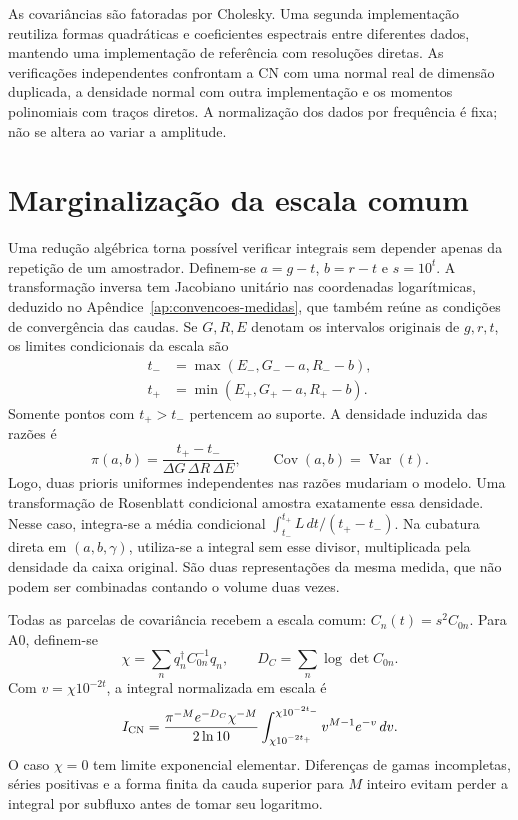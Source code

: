 As covariâncias são fatoradas por Cholesky. Uma segunda implementação
reutiliza formas quadráticas e coeficientes espectrais entre diferentes
dados, mantendo uma implementação de referência com resoluções diretas.
As verificações independentes confrontam a CN com uma normal real de
dimensão duplicada, a densidade normal com outra implementação e os
momentos polinomiais com traços diretos. A normalização dos dados por
frequência é fixa; não se altera ao variar a amplitude.

\section{Marginalização da escala comum}

Uma redução algébrica torna possível verificar integrais sem depender
apenas da repetição de um amostrador. Definem-se
\(a=g-t\), \(b=r-t\) e \(s=10^t\). A transformação inversa
tem Jacobiano unitário nas coordenadas logarítmicas, deduzido no Apêndice~\ref{ap:convencoes-medidas}, que também reúne as condições de convergência das caudas. Se \(G,R,E\)
denotam os intervalos originais de \(g,r,t\), os limites condicionais
da escala são
\begin{align}
 t_-&=\max(E_-,G_--a,R_--b),\nonumber\\
 t_+&=\min(E_+,G_+-a,R_+-b).
 \label{eq:inf-suporte-escala}
\end{align}
Somente pontos com \(t_+>t_-\) pertencem ao suporte. A densidade
induzida das razões é
\begin{equation}
 \pi(a,b)=\frac{t_+-t_-}{\Delta G\,\Delta R\,\Delta E},
 \qquad \operatorname{Cov}(a,b)=\operatorname{Var}(t).
 \label{eq:inf-prior-razoes}
\end{equation}
Logo, duas prioris uniformes independentes nas razões mudariam o modelo.
Uma transformação de Rosenblatt condicional amostra exatamente essa
densidade. Nesse caso, integra-se a média condicional
\(\int_{t_-}^{t_+}L\,dt/(t_+-t_-)\). Na cubatura direta em
\((a,b,\gamma)\), utiliza-se a integral sem esse divisor, multiplicada
pela densidade da caixa original. São duas representações da mesma
medida, que não podem ser combinadas contando o volume duas vezes.

Todas as parcelas de covariância recebem a escala comum:
\(C_n(t)=s^2C_{0n}\). Para A0, definem-se
\begin{equation}
 \chi=\sum_nq_n^\dagger C_{0n}^{-1}q_n,\qquad
 D_C=\sum_n\log\det C_{0n}.
 \label{eq:inf-chi-cn}
\end{equation}
Com \(v=\chi10^{-2t}\), a integral normalizada em escala é
\begin{equation}
 I_{\rm CN}=\frac{\pi^{-M}e^{-D_C}\chi^{-M}}{2\ln10}
 \int_{\chi10^{-2t_+}}^{\chi10^{-2t_-}}
           v^{M-1}e^{-v}\,dv.
 \label{eq:inf-escala-cn}
\end{equation}
O caso \(\chi=0\) tem limite exponencial elementar. Diferenças de
gamas incompletas, séries positivas e a forma finita da cauda superior
para \(M\) inteiro evitam perder a integral por subfluxo antes de
tomar seu logaritmo.

